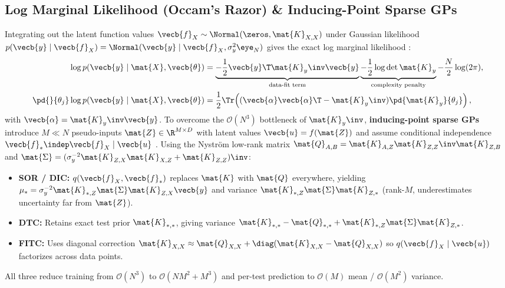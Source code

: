 \documentclass[../../../../master.tex]{subfiles}
\begin{document}
\subsection{Log Marginal Likelihood (Occam's Razor) \& Inducing-Point Sparse GPs}

\begin{coremath}
\label{thm:pgmgp:lml_sparse}
Integrating out the latent function values $\vecb{f}_X \sim \Normal(\zeros, \mat{K}_{X,X})$ under Gaussian likelihood $p(\vecb{y} \mid \vecb{f}_X) = \Normal(\vecb{y} \mid \vecb{f}_X, \sigma_y^2\eye_N)$ gives the exact log marginal likelihood :
\begin{align}
\label{eq:pgmgp:lml}
\log p(\vecb{y} \mid \mat{X}, \vecb{\theta})
&= \underbrace{-\frac{1}{2} \vecb{y}\T \mat{K}_y\inv \vecb{y}}_{\text{data-fit term}}
  \underbrace{-\frac{1}{2} \log\det \mat{K}_y}_{\text{complexity penalty}}
  -\frac{N}{2}\log(2\pi), \\
\pd{}{\theta_j}\log p(\vecb{y} \mid \mat{X}, \vecb{\theta})
&= \frac{1}{2}\Tr\!\left((\vecb{\alpha}\vecb{\alpha}\T - \mat{K}_y\inv)\pd{\mat{K}_y}{\theta_j}\right),
\end{align}
with $\vecb{\alpha} = \mat{K}_y\inv \vecb{y}$. To overcome the $\mathcal{O}(N^3)$ bottleneck of $\mat{K}_y\inv$, \textbf{inducing-point sparse GPs} introduce $M \ll N$ pseudo-inputs $\mat{Z} \in \R^{M \times D}$ with latent values $\vecb{u} = f(\mat{Z})$ and assume conditional independence $\vecb{f}_* \indep \vecb{f}_X \mid \vecb{u}$ . Using the Nystr\"om low-rank matrix $\mat{Q}_{A,B} = \mat{K}_{A,Z}\mat{K}_{Z,Z}\inv\mat{K}_{Z,B}$ and $\mat{\Sigma} = (\sigma_y^{-2}\mat{K}_{Z,X}\mat{K}_{X,Z} + \mat{K}_{Z,Z})\inv$:
\begin{itemize}
  \item \textbf{SOR / DIC:} $q(\vecb{f}_X, \vecb{f}_*)$ replaces $\mat{K}$ with $\mat{Q}$ everywhere, yielding $\mu_* = \sigma_y^{-2}\mat{K}_{*,Z}\mat{\Sigma}\mat{K}_{Z,X}\vecb{y}$ and variance $\mat{K}_{*,Z}\mat{\Sigma}\mat{K}_{Z,*}$ (rank-$M$, underestimates uncertainty far from $\mat{Z}$).
  \item \textbf{DTC:} Retains exact test prior $\mat{K}_{*,*}$, giving variance $\mat{K}_{*,*} - \mat{Q}_{*,*} + \mat{K}_{*,Z}\mat{\Sigma}\mat{K}_{Z,*}$.
  \item \textbf{FITC:} Uses diagonal correction $\mat{K}_{X,X} \approx \mat{Q}_{X,X} + \diag(\mat{K}_{X,X} - \mat{Q}_{X,X})$ so $q(\vecb{f}_X \mid \vecb{u})$ factorizes across data points.
\end{itemize}
All three reduce training from $\mathcal{O}(N^3)$ to $\mathcal{O}(NM^2 + M^3)$ and per-test prediction to $\mathcal{O}(M)$ mean / $\mathcal{O}(M^2)$ variance.
\end{coremath}
\end{document}

